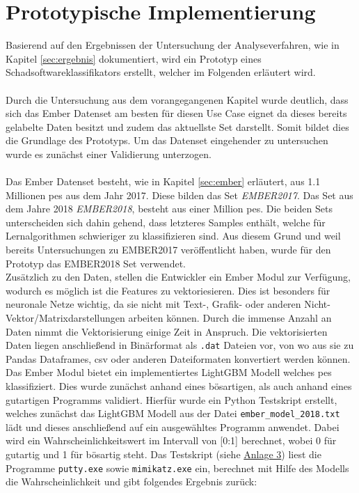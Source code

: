 \documentclass[
    12pt, %
    DIV10,
    ngerman, %
    a4paper, %
    oneside, %
    titlepage, %
    parskip=half, %
    headings=normal, %
    listof=totoc, %
    bibliography=totoc, %
    index=totoc, %
    captions=tableheading, %
    final %
]{scrreprt}
\begin{document}
\chapter{Prototypische Implementierung}
Basierend auf den Ergebnissen der Untersuchung der Analyseverfahren, wie in Kapitel \ref{sec:ergebnis} dokumentiert, wird ein Prototyp eines Schadsoftwareklassifikators erstellt, welcher im Folgenden erläutert wird.\\\\
Durch die Untersuchung aus dem vorangegangenen Kapitel wurde deutlich, dass sich das Ember Datenset am besten für diesen Use Case eignet da dieses bereits gelabelte Daten besitzt und zudem das aktuellste Set darstellt. Somit bildet dies die Grundlage des Prototyps. Um das Datenset eingehender zu untersuchen wurde es zunächst einer Validierung unterzogen.\\\\
Das Ember Datenset besteht, wie in Kapitel \ref{sec:ember} erläutert, aus 1.1 Millionen \ac{pes} aus dem Jahr 2017. Diese bilden das Set \emph{EMBER2017}. Das Set aus dem Jahre 2018 \emph{EMBER2018}, besteht aus einer Million \ac{pes}. Die beiden Sets unterscheiden sich dahin gehend, dass letzteres Samples enthält, welche für Lernalgorithmen schwieriger zu klassifizieren sind. Aus diesem Grund und weil \textcite{anderson2018ember} bereits Untersuchungen zu EMBER2017 veröffentlicht haben, wurde für den Prototyp das EMBER2018 Set
 verwendet.\\Zusätzlich zu den Daten, stellen die Entwickler ein Ember Modul zur Verfügung, wodurch es möglich ist die Features zu vektoriesieren. Dies ist besonders für neuronale Netze wichtig, da sie nicht mit Text-, Grafik- oder anderen Nicht-Vektor/Matrixdarstellungen arbeiten können. Durch die immense Anzahl an Daten nimmt die Vektorisierung einige Zeit in Anspruch. Die vektorisierten Daten liegen anschlie{\ss}end in Binärformat als \texttt{.dat} Dateien vor, von wo aus sie zu Pandas Dataframes, \ac{csv} oder anderen Dateiformaten konvertiert werden können.\\
Das Ember Modul bietet ein implementiertes LightGBM Modell welches \ac{pes} klassifiziert. Dies wurde zunächst anhand eines bösartigen, als auch anhand eines gutartigen Programms validiert.
Hierfür wurde ein Python Testskript erstellt, welches zunächst das LightGBM Modell aus der Datei \texttt{ember\_model\_2018.txt} lädt und dieses anschlie{\ss}end auf ein ausgewähltes Programm anwendet. Dabei wird ein Wahrscheinlichkeitswert im Intervall von [0:1] berechnet, wobei 0 für gutartig und 1 für bösartig steht. Das Testskript (siehe \hyperref[testskript]{Anlage 3}) liest die Programme \texttt{putty.exe} sowie \texttt{mimikatz.exe} ein, berechnet mit Hilfe des Modells die Wahrscheinlichkeit und gibt folgendes Ergebnis zurück:
\end{document}

